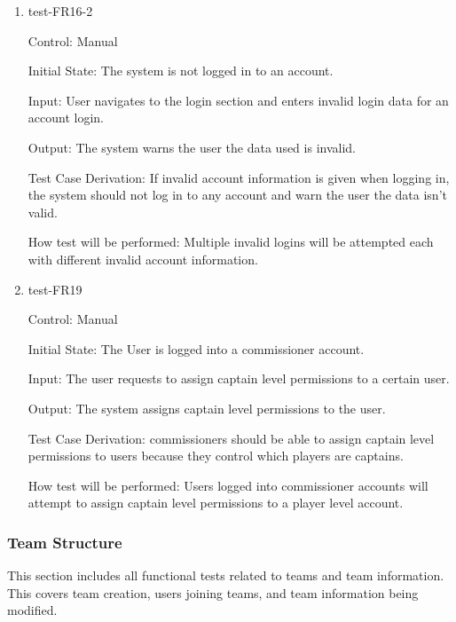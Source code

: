 \documentclass[12pt, titlepage]{article}
\begin{document}
\begin{enumerate}
  \item{test-FR16-2\\}

  Control: Manual

  Initial State: The system is not logged in to an account.

  Input: User navigates to the login section and enters invalid login data
  for an account login.

  Output: The system warns the user the data used is invalid.

  Test Case Derivation: If invalid account information is given when logging
  in, the system should not log in to any account and warn the user the data
  isn't valid.

  How test will be performed: Multiple invalid logins will be attempted each
  with different invalid account information.

  \item{test-FR19\\}

  Control: Manual

  Initial State: The User is logged into a commissioner account.

  Input: The user requests to assign captain level permissions to a 
  certain user.

  Output: The system assigns captain level permissions to the user.

  Test Case Derivation: commissioners should be able to assign captain level
  permissions to users because they control which players are captains.

  How test will be performed: Users logged into commissioner accounts will attempt
  to assign captain level permissions to a player level account.

\end{enumerate}

\subsubsection{Team Structure}

This section includes all functional tests related to teams and team
information. This covers team creation, users joining teams, and team
information being modified.
\end{document}
